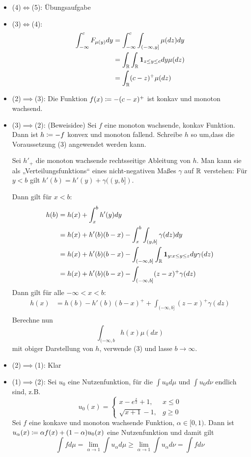 \documentclass[a4paper,twoside,DIV15,BCOR12mm]{scrbook}
\begin{document}
\begin{beweis}
\begin{itemize}
\item (4)$\iff$(5): Übungsaufgabe
\item (3)$\iff$(4):
\begin{align*}
\int_{-\infty}^c F_{\mu(y)}dy &= \int_{-\infty}^c \int_{(-\infty,y]} \mu(dz)dy \\
&=\int_{\mathbb{R}} \int_{\mathbb{R}} \mathbf 1_{z\le y\le c}dy \mu(dz) \\
&=\int_{\mathbb{R}} (c-z)^+ \mu(dz)
\end{align*}
\item (2)$\implies$(3): Die Funktion $f(x) \da -(c-x)^+$ ist konkav und monoton wachsend.
\item (3)$\implies$(2): (Beweisidee) Sei $f$ eine monoton wachsende, konkav Funktion. Dann ist $h\da -f$ konvex und monoton fallend. Schreibe $h$ so um,dass die Voraussetzung (3) angewendet werden kann.

Sei $h'_+$ die monoton wachsende rechtsseitige Ableitung von $h$. Man kann sie als „Verteilungsfunktions“ eines nicht-negativen Maßes $\gamma$ auf $\mathbb{R}$ verstehen: Für $y<b$ gilt $h'(b) = h'(y) + \gamma( (y,b])$.

Dann gilt für $x<b$:
\begin{align*}
h(b) &= h(x) + \int_x^b h'(y) dy \\
&=h(x) + h'(b)(b-x) -\int_x^b \int_{(y,b]} \gamma(dz)dy \\
&=h(x) + h'(b)(b-x) - \int_{(-\infty,b]}\int_{\mathbb{R}} \mathbf 1_{y:x\le y \le z} dy \gamma(dz) \\
&=h(x) + h'(b)(b-x) - \int_{(-\infty,b]} (z-x)^+ \gamma(dz) 
\end{align*}
Dann gilt für alle $-\infty<x<b$:
\begin{align*}
h(x) &= h(b) - h'(b)(b-x)^+ + \int_{(-\infty,b]} (z-x)^+ \gamma(dz) \\
\end{align*}
Berechne nun
\[
\int_{(-\infty,b} h(x) \mu(dx)
\]
 mit obiger Darstellung von $h$, verwende (3) und lasse $b\to\infty$.
\item (2)$\implies$(1): Klar
\item (1)$\implies$(2): Sei $u_0$ eine Nutzenfunktion, für die $\int u_0d\mu$ und $\int u_0d\nu$ endlich sind, z.B.
\[
u_0(x) = 
\begin{cases}
x - e^{\frac x2} + 1, & x\le 0\\
\sqrt{x + 1} -1, &g\ge 0
\end{cases}
\]
Sei $f$ eine konkave und monoton wachsende Funktion, $\alpha \in [0, 1)$. Dann ist $u_\alpha(x) \da \alpha f(x) + (1-\alpha)u_0(x)$ eine Nutzenfunktion und damit gilt 
\[
\int f d\mu = \lim_{\alpha\to 1} \int u_\alpha d\mu \ge \lim_{\alpha \to 1} \int u_{\alpha}d\nu = \int f d\nu
\]
\end{itemize}
\end{beweis}
\end{document}
